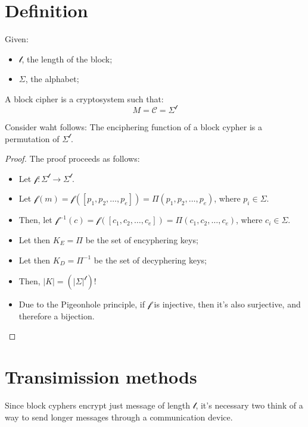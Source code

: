 \section{Definition}
Given:
\begin{itemize}
    \item $\mathcal{l}$, the length of the block;
    \item $\Sigma$, the alphabet;
\end{itemize}
A block cipher is a cryptosystem such that:
\[M = \mathcal{C} = \Sigma^{\mathcal{l}}\]
\begin{proposition}
    Consider waht follows:\newline
    The enciphering function of a block cypher is a permutation of $\Sigma^{\mathcal{l}}$.
\end{proposition}
\begin{proof}
    The proof proceeds as follows:
    \begin{itemize}
        \item Let $\mathcal{f}: \Sigma^{\mathcal{l}} \rightarrow \Sigma^{\mathcal{l}}$.
        \item Let $\mathcal{f}(m) = \mathcal{f}([p_{1}, p_{2}, \dots, p_{e}]) = \Pi(p_{1}, p_{2}, \dots, p_{e})$, where $p_{i} \in \Sigma$.
        \item Then, let $\mathcal{f}^{-1}(c) = \mathcal{f}([c_{1}, c_{2}, \dots, c_{e}]) = \Pi(c_{1}, c_{2}, \dots, c_{e})$, where $c_{i} \in \Sigma$.
        \item Let then $K_{E} = \Pi$ be the set of encyphering keys;
        \item Let then $K_{D} = \Pi^{-1}$ be the set of decyphering keys;
        \item Then, $|K| = (|\Sigma|^{\mathcal{l}})!$
        \item Due to the Pigeonhole principle, if $\mathcal{f}$ is injective, then it's also surjective, and therefore a bijection.
    \end{itemize}
\end{proof}

\section{Transimission methods}
Since block cyphers encrypt just message of length $\mathcal{l}$, it's necessary two think of a way to send longer messages through a communication device.
